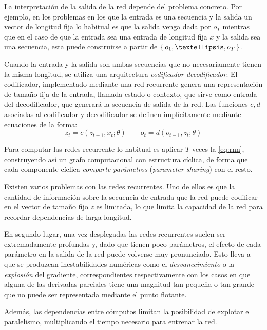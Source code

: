 La interpretación de la salida de la red depende del problema concreto. Por ejemplo, en los problemas en los que la entrada es una secuencia y la salida un vector de longitud fija lo habitual es que la salida venga dada por \( o_{T} \) mientras que en el caso de que la entrada sea una entrada de longitud fija \( x \) y la salida sea una secuencia, esta puede construirse a partir de \( \Set{ o_{1}, …, o_{T} } \).

Cuando la entrada y la salida son ambas secuencias que no necesariamente tienen la misma longitud, se utiliza una arquitectura \textit{codificador-decodificador}. El codificador, implementado mediante una red recurrente genera una representación de tamaño fija de la entrada, llamada estado o contexto, que sirve como entrada del decodificador, que generará la secuencia de salida de la red. Las funciones \( c, d \) asociadas al codificador y decodificador se definen implícitamente mediante ecuaciones de la forma:
\begin{equation} \label{eq:encoder}
    z_{t} = c(z_{t-1}, x_{t}; \theta) \qquad o_{t} = d(o_{t-1}, z_{t}; \theta)
\end{equation}

Para computar las redes recurrente lo habitual es aplicar \( T \) veces la \cref{eq:rnn}, construyendo así un grafo computacional con estructura cíclica, de forma que cada componente cíclica \textit{comparte parámetros} (\textit{parameter sharing}) con el resto. 

Existen varios problemas con las redes recurrentes. Uno de ellos es que la cantidad de información sobre la secuencia de entrada que la red puede codificar en el vector de tamaño fijo \( z \) es limitada, lo que limita la capacidad de la red para recordar dependencias de larga longitud. 

En segundo lugar, una vez desplegadas las redes recurrentes suelen ser extremadamente profundas y, dado que tienen poco parámetros, el efecto de cada parámetro en la salida de la red puede volverse muy pronunciado. Esto lleva a que se produzcan inestabilidades numéricas como el \textit{desvanecimiento} o la \textit{explosión} del gradiente, correspondientes respectivamente con los casos en que alguna de las derivadas parciales tiene una magnitud tan pequeña o tan grande que no puede ser representada mediante el punto flotante. 

Además, las dependencias entre cómputos limitan la posibilidad de explotar el paralelismo, multiplicando el tiempo necesario para entrenar la red.

